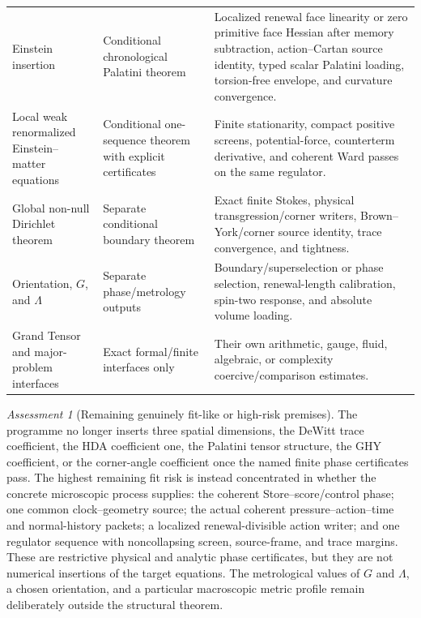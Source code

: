 \documentclass[11pt]{article}
\theoremstyle{definition}
\theoremstyle{remark}
\newtheorem{assessment}[theorem]{Assessment}
\begin{document}
\begin{longtable}{L{0.25\textwidth}L{0.22\textwidth}L{0.45\textwidth}}
Einstein insertion
& Conditional chronological Palatini theorem
& Localized renewal face linearity or zero primitive face Hessian after memory subtraction, action--Cartan source identity, typed scalar Palatini loading, torsion-free envelope, and curvature convergence.\\[0.4em]

Local weak renormalized Einstein--matter equations
& Conditional one-sequence theorem with explicit certificates
& Finite stationarity, compact positive screens, potential-force, counterterm derivative, and coherent Ward passes on the same regulator.\\[0.4em]

Global non-null Dirichlet theorem
& Separate conditional boundary theorem
& Exact finite Stokes, physical transgression/corner writers, Brown--York/corner source identity, trace convergence, and tightness.\\[0.4em]

Orientation, \(G\), and \(\Lambda\)
& Separate phase/metrology outputs
& Boundary/superselection or phase selection, renewal-length calibration, spin-two response, and absolute volume loading.\\[0.4em]

Grand Tensor and major-problem interfaces
& Exact formal/finite interfaces only
& Their own arithmetic, gauge, fluid, algebraic, or complexity coercive/comparison estimates.\\
\bottomrule
\end{longtable}

\begin{assessment}[Remaining genuinely fit-like or high-risk premises]
The programme no longer inserts three spatial dimensions, the DeWitt trace
coefficient, the HDA coefficient one, the Palatini tensor structure, the GHY
coefficient, or the corner-angle coefficient once the named finite phase
certificates pass.  The highest remaining fit risk is instead concentrated in
whether the concrete microscopic process supplies: the coherent
Store--score/control phase; one common clock--geometry source; the actual
coherent pressure--action--time and normal-history packets; a localized
renewal-divisible action writer; and one regulator sequence with noncollapsing
screen, source-frame, and trace margins.  These are restrictive physical and
analytic phase certificates, but they are not numerical insertions of the
target equations.  The metrological values of \(G\) and \(\Lambda\), a chosen
orientation, and a particular macroscopic metric profile remain deliberately
outside the structural theorem.
\end{assessment}
\end{document}
